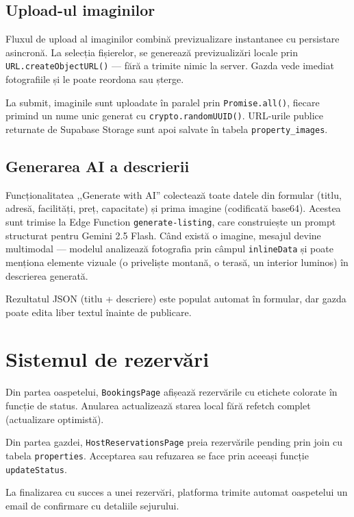 \documentclass[12pt,a4paper,oneside]{report}
\begin{document}
\subsection{Upload-ul imaginilor}

Fluxul de upload al imaginilor combină previzualizare instantanee cu persistare asincronă. La selecția fișierelor, se generează previzualizări locale prin \texttt{URL.createObjectURL()} — fără a trimite nimic la server. Gazda vede imediat fotografiile și le poate reordona sau șterge.

La submit, imaginile sunt uploadate în paralel prin \texttt{Promise.all()}, fiecare primind un nume unic generat cu \texttt{crypto.randomUUID()}. URL-urile publice returnate de Supabase Storage sunt apoi salvate în tabela \texttt{property\_images}.

\subsection{Generarea AI a descrierii}

Funcționalitatea ,,Generate with AI'' colectează toate datele din formular (titlu, adresă, facilități, preț, capacitate) și prima imagine (codificată base64). Acestea sunt trimise la Edge Function \texttt{generate-listing}, care construiește un prompt structurat pentru Gemini 2.5 Flash. Când există o imagine, mesajul devine multimodal — modelul analizează fotografia prin câmpul \texttt{inlineData} și poate menționa elemente vizuale (o priveliște montană, o terasă, un interior luminos) în descrierea generată.

Rezultatul JSON (titlu + descriere) este populat automat în formular, dar gazda poate edita liber textul înainte de publicare.


\section{Sistemul de rezervări}

Din partea oaspetelui, \texttt{BookingsPage} afișează rezervările cu etichete colorate în funcție de status. Anularea actualizează starea local fără refetch complet (actualizare optimistă).

Din partea gazdei, \texttt{HostReservationsPage} preia rezervările pending prin join cu tabela \texttt{properties}. Acceptarea sau refuzarea se face prin aceeași funcție \texttt{updateStatus}.

La finalizarea cu succes a unei rezervări, platforma trimite automat oaspetelui un email de confirmare cu detaliile sejurului.
\end{document}
